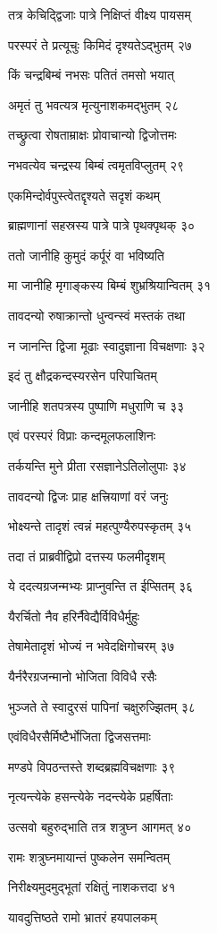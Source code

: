 तत्र केचिद्द्विजाः पात्रे निक्षिप्तं वीक्ष्य पायसम्

परस्परं ते प्रत्यूचुः किमिदं दृश्यतेऽद्भुतम् २७

किं चन्द्रबिम्बं नभसः पतितं तमसो भयात्

अमृतं तु भवत्यत्र मृत्युनाशकमद्भुतम् २८

तच्छ्रुत्वा रोषताम्राक्षः प्रोवाचान्यो द्विजोत्तमः

नभवत्येव चन्द्रस्य बिम्बं त्वमृतविप्लुतम् २९

एकमिन्दोर्वपुस्त्वेतद्दृश्यते सदृशं कथम्

ब्राह्मणानां सहस्रस्य पात्रे पात्रे पृथक्पृथक् ३०

ततो जानीहि कुमुदं कर्पूरं वा भविष्यति

मा जानीहि मृगाङ्कस्य बिम्बं शुभ्रश्रियान्वितम् ३१

तावदन्यो रुषाक्रान्तो धुन्वन्स्वं मस्तकं तथा

न जानन्ति द्विजा मूढाः स्वादुज्ञाना विचक्षणाः ३२

इदं तु क्षौद्रकन्दस्यरसेन परिपाचितम्

जानीहि शतपत्रस्य पुष्पाणि मधुराणि च ३३

एवं परस्परं विप्राः कन्दमूलफलाशिनः

तर्कयन्ति मुने प्रीता रसज्ञानेऽतिलोलुपाः ३४

तावदन्यो द्विजः प्राह क्षत्त्रियाणां वरं जनुः

भोक्ष्यन्ते तादृशं त्वन्नं महत्पुण्यैरुपस्कृतम् ३५

तदा तं प्राब्रवीद्विप्रो दत्तस्य फलमीदृशम्

ये ददत्यग्रजन्मभ्यः प्राप्नुवन्ति त ईप्सितम् ३६

यैरर्चितो नैव हरिर्नैवेद्यैर्विविधैर्मुहुः

तेषामेतादृशं भोज्यं न भवेदक्षिगोचरम् ३७

यैर्नरैरग्रजन्मानो भोजिता विविधै रसैः

भुञ्जते ते स्वादुरसं पापिनां चक्षुरुज्झितम् ३८

एवंविधैरसैर्मिष्टैर्भोजिता द्विजसत्तमाः

मण्डपे विपठन्तस्ते शब्दब्रह्मविचक्षणाः ३९

नृत्यन्त्येके हसन्त्येके नदन्त्येके प्रहर्षिताः

उत्सवो बहुरुद्भाति तत्र शत्रुघ्न आगमत् ४०

रामः शत्रुघ्नमायान्तं पुष्कलेन समन्वितम्

निरीक्ष्यमुदमुद्भूतां रक्षितुं नाशकत्तदा ४१

यावदुत्तिष्ठते रामो भ्रातरं हयपालकम्

